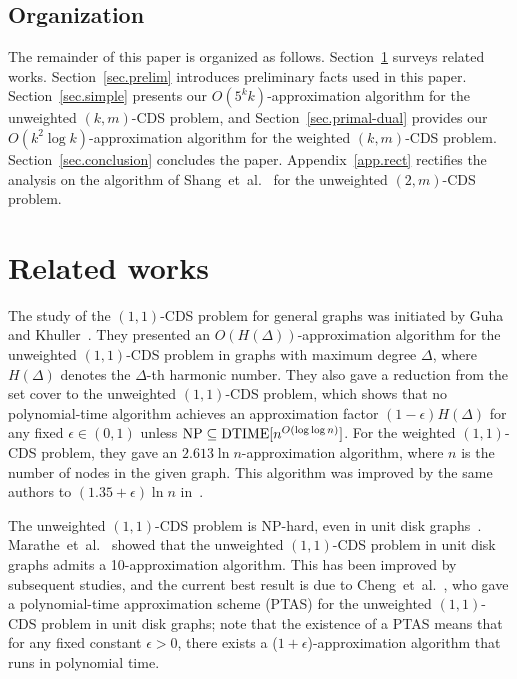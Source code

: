 \documentclass[11pt]{article}
\begin{document}
 \subsection{Organization}

 The remainder of this paper is organized as follows. 
 Section~\ref{sec.relatedworks} surveys related works.
 Section~\ref{sec.prelim} introduces preliminary facts used in this
 paper.
 Section~\ref{sec.simple} presents our $O(5^k k)$-approximation
 algorithm for the unweighted $(k,m)$-CDS problem, and
 Section~\ref{sec.primal-dual} provides our $O(k^2 \log
 k)$-approximation algorithm for the weighted $(k,m)$-CDS
 problem. Section~\ref{sec.conclusion} concludes the paper.
 Appendix~\ref{app.rect} rectifies the analysis on the algorithm of Shang~et~al.~\cite{Shang:2007jg}
 for the unweighted $(2,m)$-CDS problem.
 
\section{Related works}
\label{sec.relatedworks}

The study of the $(1,1)$-CDS problem for general graphs was initiated 
by Guha and Khuller~\cite{GuhaK98}. They presented an
$O(H(\Delta))$-approximation algorithm for the unweighted $(1,1)$-CDS
problem in graphs
with maximum degree $\Delta$,
where $H(\Delta)$ denotes the $\Delta$-th harmonic number.
They also
gave a reduction from the set cover to the unweighted $(1,1)$-CDS problem,
which shows that no polynomial-time algorithm achieves
an approximation factor $(1-\epsilon)H(\Delta)$
for any fixed $\epsilon \in (0, 1)$ unless
${\rm NP} \subseteq {\rm DTIME}[n^{O(\log \log n)}]$.
For the weighted $(1,1)$-CDS problem,
they gave an $2.613\ln n$-approximation
algorithm, where $n$ is the number of nodes in
the given graph.
This algorithm was improved by the same authors to $(1.35+\epsilon)\ln n$ in~\cite{GuhaK99}.

The unweighted $(1,1)$-CDS problem is NP-hard, even in unit disk graphs~\cite{ClarkCJ90}.
 Marathe~et~al.~\cite{MaratheBHRR95}
showed that the unweighted $(1,1)$-CDS problem in unit disk graphs admits a 10-approximation algorithm.
This has been improved by subsequent studies, and the current
best result is due to 
Cheng~et~al.~\cite{ChengHLWD03}, who gave a
polynomial-time approximation scheme
(PTAS) for the unweighted
$(1,1)$-CDS problem in unit disk graphs; note that the existence of a PTAS means
that for
any fixed constant $\epsilon >0$, there exists a 
($1+\epsilon$)-approximation algorithm that runs in polynomial time.
\end{document}
